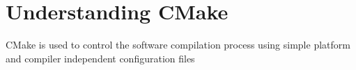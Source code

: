 \documentclass[11pt,a4paper]{article}
\begin{document}

%
%



\section{Understanding CMake} \label{sec:cmake}
CMake is used to control the software compilation process using simple platform and
compiler independent configuration files
\end{document}
